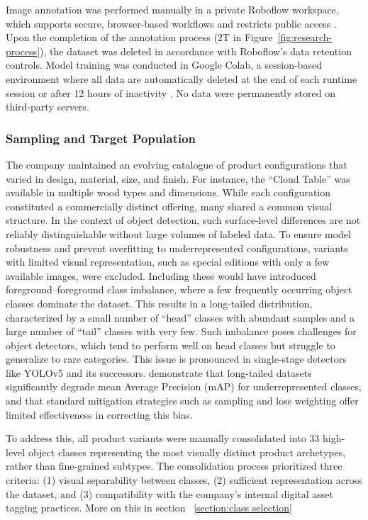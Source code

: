 \documentclass[a4paper,10pt,twocolumn]{article}
\numberwithin{figure}{section}
\numberwithin{table}{section}
\begin{document}
Image annotation was performed manually in a private Roboflow workspace, 
which supports secure, browser-based workflows and restricts public access \citep{roboflow_terms}. 
Upon the completion of the annotation process (2T in Figure~\ref{fig:research-process}), 
the dataset was deleted in accordance with Roboflow's data retention controls.
Model training was conducted in Google Colab, a session-based environment where  all data are automatically deleted at the end of each runtime session or after 12 hours of inactivity \citep{colab_terms}. No data were permanently stored 
on third-party servers.

\vspace{0.3cm} 
\subsubsection{Sampling and Target Population}
\vspace{0.3cm} 

The company maintained an evolving catalogue of product 
configurations that varied in design, material, size, 
and finish. For instance, the “Cloud Table” was available 
in multiple wood types and dimensions. While each 
configuration constituted a commercially distinct 
offering, many shared a common visual structure. 
In the context of object detection, such surface-level 
differences are not reliably distinguishable without 
large volumes of labeled data.
To ensure model robustness and prevent overfitting to 
underrepresented configurations, variants with limited 
visual representation, such as special editions with 
only a few available images, were excluded. Including 
these would have introduced foreground–foreground class 
imbalance, where a few frequently occurring object classes 
dominate the dataset. This results in a long-tailed 
distribution, characterized by a small number of “head” 
classes with abundant samples and a large number of “tail” 
classes with very few. Such imbalance poses challenges for 
object detectors, which tend to perform well on head 
classes but struggle to generalize to rare categories. 
This issue is pronounced in single-stage detectors like 
YOLOv5 and its successors. \citet{crasto2024imbalance} 
demonstrate that long-tailed datasets significantly 
degrade mean Average Precision (mAP) for underrepresented 
classes, and that standard mitigation strategies such as 
sampling and loss weighting offer limited effectiveness 
in correcting this bias.

To address this, all product variants were manually 
consolidated into 33 high-level object classes 
representing the most visually distinct product 
archetypes, rather than fine-grained subtypes. 
The consolidation process prioritized three criteria: 
(1) visual separability between classes, (2) sufficient 
representation across the dataset, and (3) compatibility 
with the company’s internal digital asset tagging practices.
More on this in section ~\ref{section:class selection}
\end{document}
